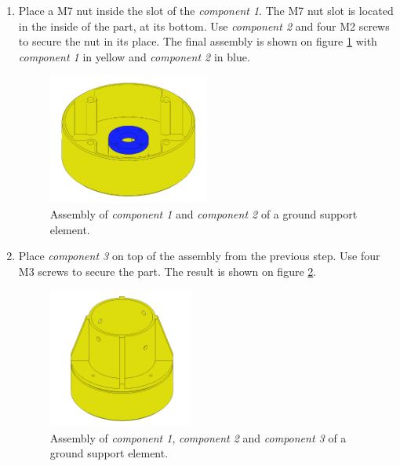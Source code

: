 \documentclass{article}
\begin{document}
\begin{enumerate}
    \item Place a M7 nut inside the slot of the \textit{component 1}. The M7 nut slot is located in the inside of the part, at its bottom. Use \textit{component 2} and four M2 screws to secure the nut in its place. The final assembly is shown on figure \ref{fig:gs_step_3} with \textit{component 1} in yellow and \textit{component 2} in blue.
    
    \begin{figure}[H]
        \centering
        \includegraphics[width=0.5\textwidth]{images/ground/step_C.png}
        \caption{Assembly of \textit{component 1} and \textit{component 2} of a ground support element.}
        \label{fig:gs_step_3}
    \end{figure}
    
    \item Place \textit{component 3} on top of the assembly from the previous step. Use four M3 screws to secure the part. The result is shown on figure \ref{fig:gs_step_4}.
    
    \begin{figure}[H]
        \centering
        \includegraphics[width=0.45\textwidth]{images/ground/step_D.png}
        \caption{Assembly of \textit{component 1}, \textit{component 2} and \textit{component 3} of a ground support element.}
        \label{fig:gs_step_4}
    \end{figure}
    

\end{enumerate}
\end{document}

